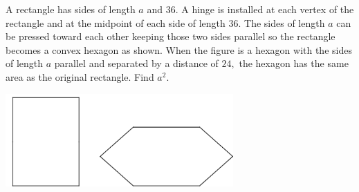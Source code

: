 A rectangle has sides of length $a$ and $36$. A hinge is installed at each vertex of the rectangle and at the midpoint of each side of length $36$. The sides of length $a$ can be pressed toward each other keeping those two sides parallel so the rectangle becomes a convex hexagon as shown. When the figure is a hexagon with the sides of length $a$ parallel and separated by a distance of $24,$ the hexagon has the same area as the original rectangle. Find $a^2$.


\begin{center}
\includegraphics[width = 87.0mm]{img/fig0.png}
\end{center}